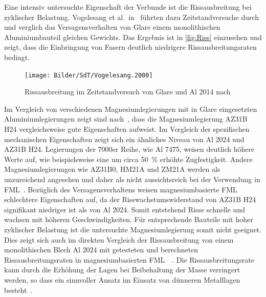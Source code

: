 Eine intensiv untersuchte Eigenschaft der Verbunde ist die Rissausbreitung bei zyklischer Belastung.
Vogelesang et al.\ in~\cite{Demaid1995} führten dazu Zeitstandversuche durch und verglich das Versagensverhalten von Glare einem monolithischen Aluminiumbauteil gleichen Gewichts.
Das Ergebnis ist in \autoref{fig:Riss} einzusehen und zeigt, dass die Einbringung von Fasern deutlich niedrigere Rissausbreitungsraten bedingt.


\begin{figure}[H]%
    \centering
    \texttt{[image: Bilder/SdT/Vogelesang.2000]}
    \caption[Zeitstandversuch Glare vs. Al 2024]{Rissausbreitung im Zeitstandversuch von Glare und Al 2014 nach~\cite{Vogelesang2000}}
    \label{fig:Riss}
\end{figure}




Im Vergleich von verschiedenen Magnesiumlegierungen mit in Glare eingesetzten Aluminiumlegierungen zeigt sind nach~\cite{Alderliesten2008}, dass die Magnesiumlegierung AZ31B H24 vergleichsweise gute Eigenschaften aufweist.
Im Vergleich der spezifischen mechanischen Eigenschaften zeigt sich ein ähnliches Niveau von Al 2024 und AZ31B H24.
Legierungen der 7000er Reihe, wie Al 7475, weisen deutlich höhere Werte auf, wie beispielsweise eine um circa \SI{50}{\percent} erhöhte Zugfestigkeit.
Andere Magnesiumlegierungen wie AZ31B0, HM21A und ZM21A werden als unzureichend angesehen und daher als nicht aussichtsreich bei der Verwendung in FML~.
Bezüglich des Versagensverhaltens weisen magnesiumbasierte FML schlechtere Eigenschaften auf, da der Risswachstumswiderstand von AZ31B H24 signifikant niedriger ist als von Al 2024.
Somit entstehend Risse schnelle und wachsen mit höheren Geschwindigkeiten.
Für entsprechende Bauteile mit hoher zyklischer Belastung ist die untersuchte Magnesiumlegierung somit nicht geeignet.
Dies zeigt sich auch im direkten Vergleich der Rissausbreitung von einem monolithischen Blech Al 2024 mit getesteten und berechneten Rissausbreitungsraten in magnesiumbasierten FML~\cite{Alderliesten2008,Cortes2005}~.
Die Rissausbreitungsrate kann durch die Erhöhung der Lagen bei Beibehaltung der Masse verringert werden, so dass ein sinnvoller Ansatz im Einsatz von dünneren Metalllagen besteht~\cite{Alderliesten2008}.

